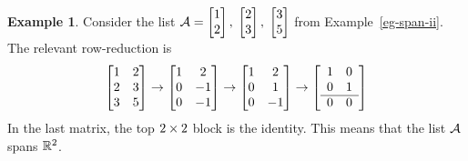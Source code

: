 \documentclass[reqno]{amsart}
\theoremstyle{definition}
\newtheorem{example}[theorem]{Example}
\begin{document}
\begin{example}
 Consider the list $\mathcal{A}=\left[\begin{matrix} 1\\2\end{matrix}\right],\;\left[\begin{matrix} 2\\3\end{matrix}\right],\;\left[\begin{matrix} 3\\5\end{matrix}\right]$
 from Example~\ref{eg-span-ii}.  The relevant row-reduction is
 \[ \left[\begin{matrix} 1 & 2 \\ 2 & 3 \\ 3 & 5 \end{matrix}\right] \to
    \left[\begin{matrix} 1 & 2 \\ 0 & -1 \\ 0 & -1 \end{matrix}\right] \to
    \left[\begin{matrix} 1 & 2 \\ 0 &  1 \\ 0 & -1 \end{matrix}\right] \to
    \left[\begin{array}{cc}
     1 & 0 \\ 0 &  1 \\ \hline 0 & 0 
    \end{array}\right]
 \]
 In the last matrix, the top $2\times 2$ block is the identity.  This
 means that the list $\mathcal{A}$ spans ${\mathbb{R}}^2$.
\end{example}
\end{document}
